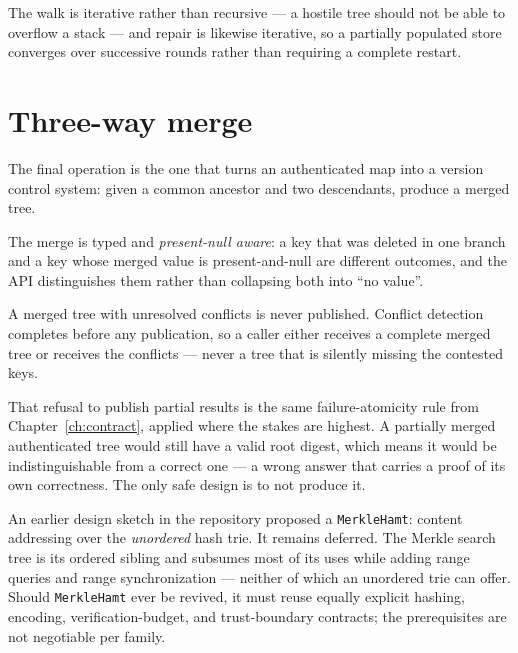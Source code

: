 \documentclass[11pt,twoside,openright]{book}
\newcommand{\code}[1]{\texorpdfstring{\textcolor{d7ink}{\texttt{#1}}}{#1}}
\begin{document}
The walk is iterative rather than recursive --- a hostile tree should not be able
to overflow a stack --- and repair is likewise iterative, so a partially
populated store converges over successive rounds rather than requiring a
complete restart.

\section{Three-way merge}

The final operation is the one that turns an authenticated map into a version
control system: given a common ancestor and two descendants, produce a merged
tree.

\begin{contractbox}
The merge is typed and \emph{present-null aware}: a key that was deleted in one
branch and a key whose merged value is present-and-null are different outcomes,
and the API distinguishes them rather than collapsing both into ``no value''.

A merged tree with unresolved conflicts is never published. Conflict detection
completes before any publication, so a caller either receives a complete merged
tree or receives the conflicts --- never a tree that is silently missing the
contested keys.
\end{contractbox}

That refusal to publish partial results is the same failure-atomicity rule from
Chapter~\ref{ch:contract}, applied where the stakes are highest. A partially
merged authenticated tree would still have a valid root digest, which means it
would be indistinguishable from a correct one --- a wrong answer that carries a
proof of its own correctness. The only safe design is to not produce it.

\begin{asidebox}
An earlier design sketch in the repository proposed a \code{MerkleHamt}: content
addressing over the \emph{unordered} hash trie. It remains deferred. The Merkle
search tree is its ordered sibling and subsumes most of its uses while adding
range queries and range synchronization --- neither of which an unordered trie
can offer. Should \code{MerkleHamt} ever be revived, it must reuse equally
explicit hashing, encoding, verification-budget, and trust-boundary contracts;
the prerequisites are not negotiable per family.
\end{asidebox}

\end{document}
